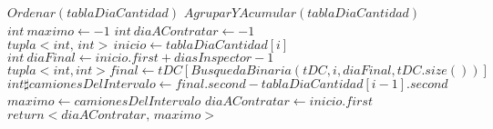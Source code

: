 
\begin{algorithmic}[1]
	
	\Statex
	\State $Ordenar (tablaDiaCantidad)$
	\State $AgruparYAcumular (tablaDiaCantidad)$
	\State $int \:  maximo \gets -1$
	\State $int \: diaAContratar \gets -1$
		\State $tupla<int, \,int> \, inicio \gets tablaDiaCantidad[i]$
		\State $int \: diaFinal \gets inicio.first + diasInspector -1$
		\State $tupla<int, int> final \gets tDC[BusquedaBinaria(tDC,i, diaFinal, tDC.size())]$
		\State $int \sharp camionesDelIntervalo \gets final.second - tablaDiaCantidad[i-1].second$
			\State $maximo \gets camionesDelIntervalo$
			\State $diaAContratar \gets inicio.first$
		\EndIf
	\EndFor
	\State $return <diaAContratar, \, maximo>$
	\EndProcedure
	\Statex
	\end{algorithmic}